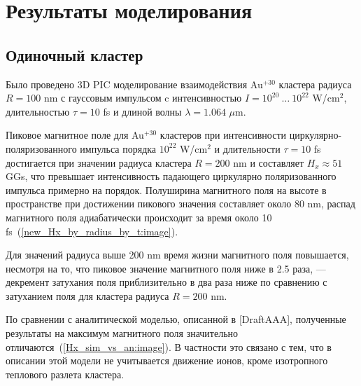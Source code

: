 \section{Результаты моделирования}

\subsection{Одиночный кластер}

Было проведено 3D PIC моделирование взаимодействия Au$^{+30}$ кластера радиуса $R = 100$ nm с гауссовым импульсом c интенсивностью $I = 10^{20}\:\dots\: 10^{22}$ W/cm$^2$, длительностью $\tau = 10$ fs и длиной волны $\lambda = 1.064$ $\mu$m.


Пиковое магнитное поле для Au$^{+30}$ кластеров при интенсивности циркулярно-поляризованного импульса порядка $10^{22}$ W/cm$^2$ и длительности $\tau = 10$ fs достигается при значении радиуса кластера $R = 200$ nm и составляет $H_x \approx 51$ GGs, что превышает интенсивность падающего циркулярно поляризованного импульса примерно на порядок. Полуширина магнитного поля на высоте в пространстве при достижении пикового значения составляет около 80 nm, распад магнитного поля адиабатически происходит за время около 10 fs~(\autoref{new_Hx_by_radius_by_t:image}).

Для значений радиуса выше 200 nm время жизни магнитного поля повышается, несмотря на то, что пиковое значение магнитного поля ниже в 2.5 раза, --- декремент затухания поля приблизительно в два раза ниже по сравнению с затуханием поля для кластера радиуса $R = 200$ nm.


По сравнении с аналитической моделью, описанной в [DraftAAA], полученные результаты на максимум магнитного поля значительно отличаются~(\autoref{Hx_sim_vs_an:image}). В частности это связано с тем, что в описании этой модели не учитывается движение ионов, кроме изотропного теплового разлета кластера. 

